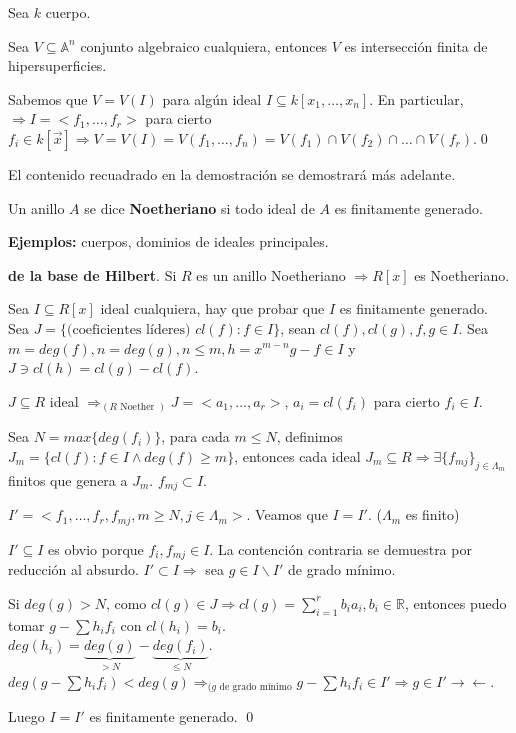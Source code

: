 Sea $k$ cuerpo.

\begin{Teo}
Sea $V\subseteq \mathbb{A}^n$ conjunto algebraico cualquiera, entonces $V$ es intersección finita de hipersuperficies.
\end{Teo}

\begin{Dem}
Sabemos que $V=V(I)$ para algún ideal $I\subseteq k[x_1,\dots, x_n]$.  En particular,  $\Rightarrow I=<f_1,\dots,f_r >$ para cierto $f_i\in k[\vec{x}] \Rightarrow V=V(I)=V(f_1,\dots , f_n) = V(f_1) \cap V(f_2)\cap \dots \cap V(f_r)$.\qed 
\end{Dem}

\begin{nota}
El contenido recuadrado en la demostración se demostrará más adelante.
\end{nota}

\begin{Def}
Un anillo $A$ se dice \textbf{Noetheriano} si todo ideal de $A$ es finitamente generado.
\end{Def}

\textbf{Ejemplos:} cuerpos, dominios de ideales principales.

\begin{Teo}
\textbf{de la base de Hilbert}. Si $R$ es un anillo Noetheriano $\Rightarrow R[x]$ es Noetheriano.
\end{Teo} 

\begin{Dem}
Sea $I\subseteq R[x]$ ideal cualquiera, hay que probar que $I$ es finitamente generado. Sea $J= \{ \text{(coeficientes líderes) } cl(f) : f\in I \}$, sean $cl(f), cl(g),f,g \in I$. Sea $m=deg(f), n=deg(g), n\le m, h=x^{m-n}g-f\in I$ y $J \ni cl(h)=cl(g)-cl(f)$. 

$J\subseteq R$ ideal $\Rightarrow_{(R \text{ Noether })}J=<a_1,\dots,a_r>$, $a_i=cl(f_i)$ para cierto $f_i\in I$.

Sea $N=max \{deg(f_i) \}$, para cada $m\le N$, definimos $J_m=\{ cl(f): f\in I \wedge deg(f)\ge m \}$, entonces cada ideal $J_m\subseteq R \Rightarrow \exists \{f_{mj} \}_{j\in \Lambda_m}$ finitos que genera a $J_m$. $f_{mj}\subset I$.

$I'=<f_1,\dots,f_r,f_{mj}, m\ge N, j\in \Lambda_m >$. Veamos que $I=I'$. ($\Lambda_m$ es finito)

$I'\subseteq I$ es obvio porque $f_i,f_{mj}\in I$. La contención contraria se demuestra por reducción al absurdo.
$I'\subset I \Rightarrow$ sea $g\in I \backslash I'$ de grado mínimo.


Si $deg(g)>N$, como $cl(g)\in J \Rightarrow cl(g)=\sum_{i=1}^r b_ia_i, b_i \in \mathbb{R}$, entonces puedo tomar $g-\sum h_if_i$ con $cl(h_i)=b_i$.  \\
$deg(h_i)=\underbrace{deg(g)}_{>N}-\underbrace{deg(f_i)}_{\le N}$. $deg(g-\sum h_if_i) < deg(g) \Rightarrow_{(g \text{ de grado mínimo}} g-\sum h_if_i \in I' \Rightarrow g\in I' \rightarrow \leftarrow $.

Luego $I=I'$ es finitamente generado. \qed

\end{Dem}

